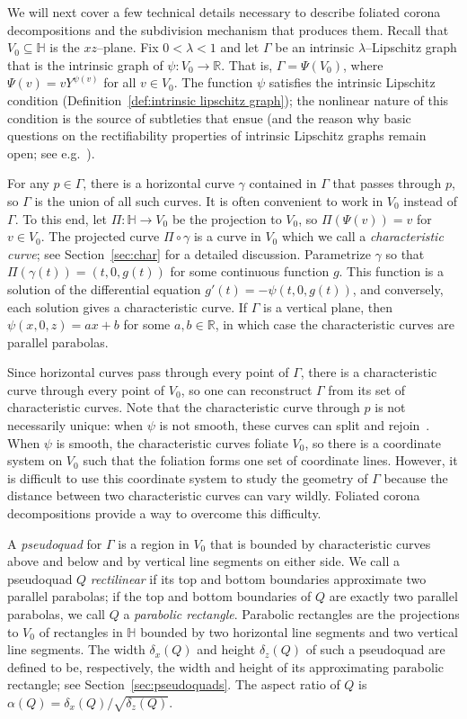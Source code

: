 \documentclass[11pt,reqno]{amsart}
\renewcommand{\H}{\mathbb{H}}
\newcommand{\R}{\mathbb{R}}
\newcommand{\0}{\mathbf{0}}
\renewcommand{\1}{\mathbf 1}
\newcommand{\from}{\colon}
\renewcommand{\subset}{\subseteq}
\theoremstyle{remark}
\begin{document}
We will next cover a few technical details necessary to describe foliated corona decompositions and the subdivision mechanism that produces them.  Recall that $V_0\subset \H$ is the $xz$--plane. Fix $0<\lambda<1$  and let $\Gamma$ be an intrinsic $\lambda$--Lipschitz graph that is the intrinsic graph of $\psi\from V_0\to \R$.  That is, $\Gamma=\Psi(V_0)$, where $\Psi(v)=vY^{\psi(v)}$ for all $v\in V_0$.  The function $\psi$ satisfies the intrinsic Lipschitz condition (Definition~\ref{def:intrinsic lipschitz graph}); the nonlinear nature of this condition is the source of subtleties that ensue (and the reason why basic questions on the rectifiability properties of intrinsic Lipschitz graphs remain open; see e.g.~\cite{DFO20}).

For any $p\in \Gamma$, there is a horizontal curve $\gamma$ contained in $\Gamma$ that passes through $p$, so $\Gamma$ is the union of all such curves. It is often convenient to work in $V_0$ instead of $\Gamma$.  To this end, let $\Pi\from \H\to V_0$ be the  projection to $V_0$, so $\Pi(\Psi(v))=v$ for  $v\in V_0$.  The projected curve $\Pi\circ \gamma$ is a curve in $V_0$ which we call a \emph{characteristic curve}; see Section~\ref{sec:char} for a detailed discussion.  Parametrize $\gamma$ so that $\Pi(\gamma(t))=(t,0,g(t))$ for some continuous function $g$.  This function is a solution of the differential equation $g'(t)=-\psi(t,0,g(t))$, and conversely, each solution gives  a characteristic curve.  If $\Gamma$ is a vertical plane, then $\psi(x,0,z)=ax+b$ for some $a,b\in \R$, in which case the characteristic curves are parallel parabolas.

Since horizontal curves pass through every point of $\Gamma$, there is a characteristic curve through every point of $V_0$, so one can reconstruct $\Gamma$ from its set of characteristic curves.  Note that the characteristic curve through $p$ is not necessarily unique: when $\psi$ is not smooth, these curves can split and rejoin~\cite{BigolinCaravennaSerraCassano}.  When $\psi$ is smooth, the characteristic curves foliate $V_0$, so there is a coordinate system on $V_0$ such that the foliation forms one set of coordinate lines.  However,  it is  difficult to use this coordinate system to study the geometry of $\Gamma$ because the distance between two characteristic curves can vary wildly. Foliated corona decompositions provide a way to overcome this difficulty.

A \emph{pseudoquad} for $\Gamma$ is a region in $V_0$ that is bounded by characteristic curves above and below and by vertical line segments on either side.  We call a pseudoquad $Q$ \emph{rectilinear} if its top and bottom boundaries approximate two parallel parabolas; if the top and bottom boundaries of $Q$ are exactly two parallel parabolas, we call $Q$ a \emph{parabolic rectangle}.  Parabolic rectangles are the projections to $V_0$ of rectangles in $\H$ bounded by two horizontal line segments and two vertical line segments.  The width $\delta_x(Q)$ and height $\delta_z(Q)$ of such a pseudoquad are defined to be, respectively, the width and height of its approximating parabolic rectangle; see Section~\ref{sec:pseudoquads}. The  aspect ratio of $Q$ is $\alpha(Q)=\delta_x(Q)/\sqrt{\delta_z(Q)}$.
\end{document}

